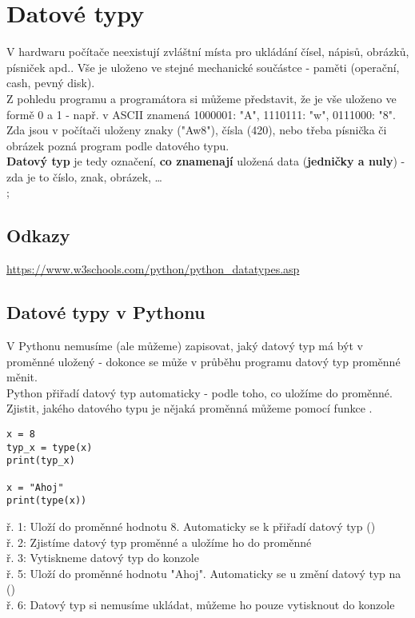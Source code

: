 \section{Datové typy}
V hardwaru počítače neexistují zvláštní místa pro ukládání čísel, nápisů, obrázků, písniček apd.. Vše je uloženo ve stejné mechanické součástce - paměti (operační, cash, pevný disk).\\
Z pohledu programu a programátora si můžeme představit, že je vše uloženo ve formě 0 a 1 - např. v ASCII znamená 1000001: "A", 1110111: "w", 0111000: "8".\\
Zda jsou v počítači uloženy znaky ("Aw8"), čísla (420), nebo třeba písnička či obrázek pozná program podle datového typu.\\
\textbf{Datový typ} je tedy označení, \textbf{co znamenají} uložená data (\textbf{jedničky a nuly}) - zda je to číslo, znak, obrázek, \dots \\;

\subsection{Odkazy}
\url{https://www.w3schools.com/python/python_datatypes.asp}

\subsection{Datové typy v Pythonu}
V Pythonu nemusíme (ale můžeme) zapisovat, jaký datový typ má být v proměnné uložený - dokonce se může v průběhu programu datový typ proměnné měnit.\\
Python přiřadí datový typ automaticky - podle toho, co uložíme do proměnné.\\
Zjistit, jakého datového typu je nějaká proměnná můžeme pomocí funkce .\\
\begin{minipage}[t]{.45\textwidth}
\begin{code}
\begin{verbatim}
x = 8
typ_x = type(x)
print(typ_x)

x = "Ahoj"
print(type(x))
\end{verbatim}

\label{code:typy_type}
\end{code}
\end{minipage}
\begin{minipage}[t]{.45\textwidth}
ř. 1:	Uloží do proměnné  hodnotu 8. Automaticky se k  přiřadí datový typ  ()\\
ř. 2:	Zjistíme datový typ proměnné  a uložíme ho do proměnné \\
ř. 3:	Vytiskneme datový typ do konzole\\
ř. 5:	Uloží do proměnné  hodnotu "Ahoj". Automaticky se u  změní datový typ na  ()\\
ř. 6:	Datový typ si nemusíme ukládat, můžeme ho pouze vytisknout do konzole
\end{minipage}\\ 

